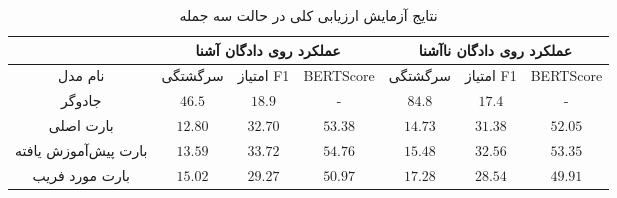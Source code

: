 \begin{table}[ht]
	\caption{نتایج آزمایش ارزیابی کلی در حالت سه جمله}
	\label{table:overall_trisentence}
	\begin{tabular}{|c|c|c|c|c|c|c|}
		\hline
		& \multicolumn{3}{c|}{عملکرد روی دادگان آشنا} & \multicolumn{3}{c|}{عملکرد روی دادگان نا‌آشنا} \\ \hline
		نام مدل              & سرگشتگی     & امتیاز F1     & BERTScore     & سرگشتگی      & امتیاز F1      & BERTScore      \\ \hline
		جادوگر               & $46.5$      & $18.9$        & -             & $84.8$       & $17.4$         & -              \\ \hline
		بارت اصلی            & $12.80$     & $32.70$       & $53.38$       & $14.73$      & $31.38$        & $52.05$        \\ \hline
		بارت پیش‌آموزش یافته & $13.59$     & $33.72$       & $54.76$       & $15.48$      & $32.56$        & $53.35$        \\ \hline
		بارت مورد فریب       & $15.02$     & $29.27$       & $50.97$       & $17.28$      & $28.54$        & $49.91$        \\ \hline
	\end{tabular}
\end{table}





